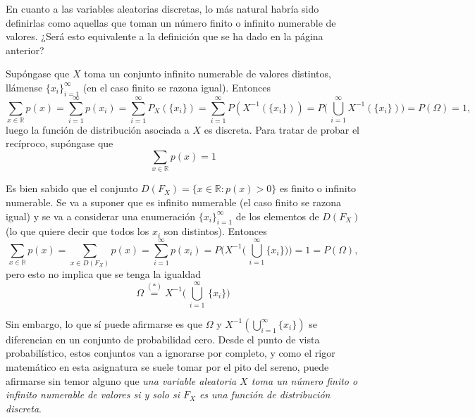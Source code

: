 \documentclass[11pt]{report}
\theoremstyle{mytheorem}
\theoremstyle{mydefinition}
\theoremstyle{myexample}
\newcommand{\R}{\mathbb R}
\begin{document}
En cuanto a las variables aleatorias discretas, lo más natural habría sido definirlas como aquellas que toman un número finito o infinito numerable de valores. ¿Será esto equivalente a la definición que se ha dado en la página anterior?

\vspace{2mm}

Supóngase que $X$ toma un conjunto infinito numerable de valores distintos, llámense $\{x_i\}_{i=1}^\infty$ (en el caso finito se razona igual). Entonces
\[\sum_{x \in \R}p(x) = \sum_{i=1}^\infty p(x_i) = \sum_{i=1}^\infty P_X(\{x_i\}) = \sum_{i=1}^\infty P(X^{-1}(\{x_i\})) =  P\biggl(\, \bigcup_{i=1}^\infty X^{-1}(\{x_i\}) \biggr) = P(\Omega) = 1,\]
luego la función de distribución asociada a $X$ es discreta. Para tratar de probar el recíproco, supóngase que
\[\sum_{x \in \R}p(x) = 1\]

Es bien sabido que el conjunto $D(F_X) = \{x \in \R \colon p(x) > 0\}$ es finito o infinito numerable. Se va a suponer que es infinito numerable (el caso finito se razona igual) y se va a considerar una enumeración $\{x_i\}_{i=1}^\infty$ de los elementos de $D(F_X)$ (lo que quiere decir que todos los $x_i$ son distintos). Entonces
\[\sum_{x \in \R}p(x) = \sum_{x \in D(F_X)}p(x) = \sum_{i=1}^\infty p(x_i) = P\biggl( X^{-1} \biggl(\,\bigcup_{i=1}^\infty \{x_i\} \biggr)\biggr) = 1 = P(\Omega),\]
pero esto no implica que se tenga la igualdad
\[\Omega \overset{(*)}{=} X^{-1} \biggl(\, \bigcup_{i=1}^\infty \, \{x_i\}\biggr)\]

Sin embargo, lo que sí puede afirmarse es que $\Omega$ y $X^{-1}(\bigcup_{i=1}^\infty \{x_i\})$ se diferencian en un conjunto de probabilidad cero. Desde el punto de vista probabilístico, estos conjuntos van a ignorarse por completo, y como el rigor matemático en esta asignatura se suele tomar por el pito del sereno, puede afirmarse sin temor alguno que \textit{una variable aleatoria $X$ toma un número finito o infinito numerable de valores si y solo si $F_X$ es una función de distribución discreta}.
\end{document}
